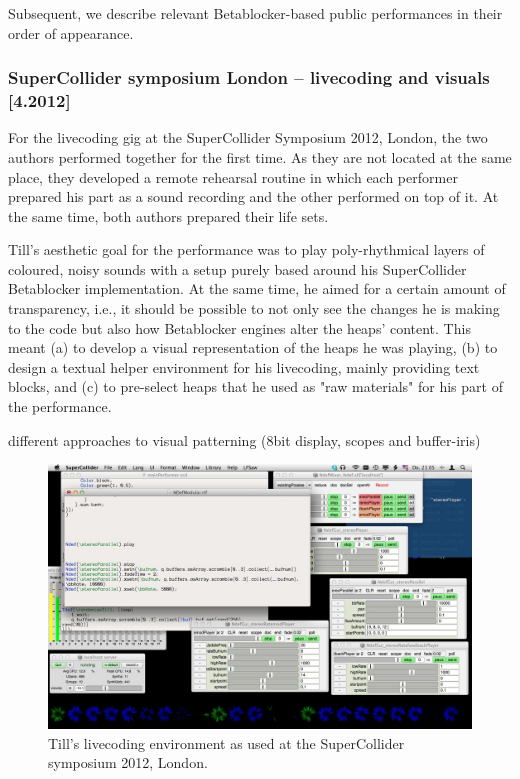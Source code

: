 \documentclass[letterpaper, 12pt]{article}
\begin{document}
Subsequent, we describe relevant Betablocker-based public performances in their order of appearance.

\subsubsection{SuperCollider symposium London -- livecoding and visuals [4.2012]}
\label{sub:livecoding_and_visuals}

For the livecoding gig at the SuperCollider Symposium 2012, London, the two authors performed together for the first time. 
As they are not located at the same place, they developed a remote rehearsal routine in which each performer prepared his part as a sound recording and the other performed on top of it.
At the same time, both authors prepared their life sets.

Till's aesthetic goal for the performance was to play poly-rhythmical layers of coloured, noisy sounds with a setup purely based around his SuperCollider Betablocker implementation. 
At the same time, he aimed for a certain amount of transparency, i.e., it should be possible to not only see the changes he is making to the code but also how  Betablocker engines alter the heaps' content.
This meant 
(a) to develop a visual representation of the heaps he was playing, 
(b) to design a textual helper environment for his livecoding, mainly providing text blocks, and
(c) to pre-select heaps that he used as "raw materials" for his part of the  performance.

different approaches to visual patterning (8bit display, scopes and buffer-iris)

\begin{figure}
	\centering
		\includegraphics[width=13cm]{2012-SuperColliderSymposiumLiveCodingEnvironment-till}
	\caption{Till's livecoding environment as used at the SuperCollider symposium 2012, London.}
	\label{fig:fig_2012-SuperColliderSymposiumLiveCodingEnvironment-till}
\end{figure}
\end{document}
